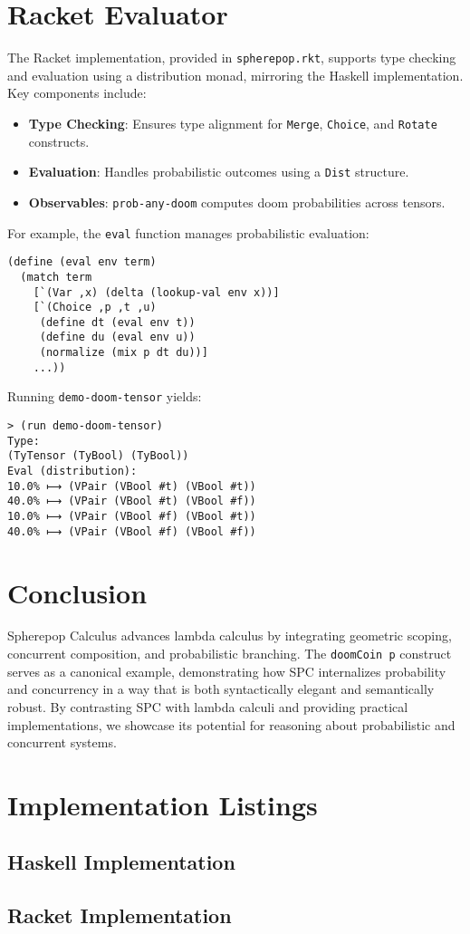 \documentclass{article}
\begin{document}
\section{Racket Evaluator}
The Racket implementation, provided in \texttt{spherepop.rkt}, supports type checking and evaluation using a distribution monad, mirroring the Haskell implementation. Key components include:

\begin{itemize}
    \item \textbf{Type Checking}: Ensures type alignment for \texttt{Merge}, \texttt{Choice}, and \texttt{Rotate} constructs.
    \item \textbf{Evaluation}: Handles probabilistic outcomes using a \texttt{Dist} structure.
    \item \textbf{Observables}: \texttt{prob-any-doom} computes doom probabilities across tensors.
\end{itemize}

For example, the \texttt{eval} function manages probabilistic evaluation:
\lstset{language=Lisp, basicstyle=\small\ttfamily, breaklines=true}
\begin{lstlisting}
(define (eval env term)
  (match term
    [`(Var ,x) (delta (lookup-val env x))]
    [`(Choice ,p ,t ,u)
     (define dt (eval env t))
     (define du (eval env u))
     (normalize (mix p dt du))]
    ...))
\end{lstlisting}

Running \texttt{demo-doom-tensor} yields:
\begin{verbatim}
> (run demo-doom-tensor)
Type:
(TyTensor (TyBool) (TyBool))
Eval (distribution):
10.0% ⟼ (VPair (VBool #t) (VBool #t))
40.0% ⟼ (VPair (VBool #t) (VBool #f))
10.0% ⟼ (VPair (VBool #f) (VBool #t))
40.0% ⟼ (VPair (VBool #f) (VBool #f))
\end{verbatim}

\section{Conclusion}
Spherepop Calculus advances lambda calculus by integrating geometric scoping, concurrent composition, and probabilistic branching. The \texttt{doomCoin p} construct serves as a canonical example, demonstrating how SPC internalizes probability and concurrency in a way that is both syntactically elegant and semantically robust. By contrasting SPC with lambda calculi and providing practical implementations, we showcase its potential for reasoning about probabilistic and concurrent systems.

\appendix

\section{Implementation Listings}
\subsection{Haskell Implementation}

\subsection{Racket Implementation}

\end{document}

